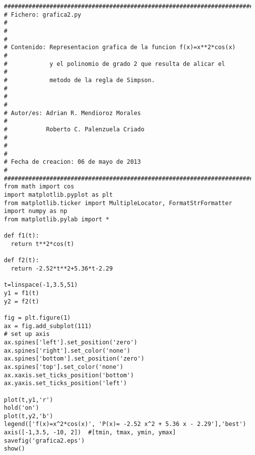 \begin{center}
\begin{footnotesize}
\begin{verbatim}
########################################################################
# Fichero: grafica2.py                                                 #
#                                                                      #
# Contenido: Representacion grafica de la funcion f(x)=x**2*cos(x)     #
#            y el polinomio de grado 2 que resulta de alicar el        #
#            metodo de la regla de Simpson.                            #
#                                                                      #
# Autor/es: Adrian R. Mendioroz Morales                                #
#           Roberto C. Palenzuela Criado                               #
#                                                                      #
# Fecha de creacion: 06 de mayo de 2013                                #
########################################################################
from math import cos
import matplotlib.pyplot as plt
from matplotlib.ticker import MultipleLocator, FormatStrFormatter
import numpy as np
from matplotlib.pylab import *

def f1(t):
  return t**2*cos(t)

def f2(t):
  return -2.52*t**2+5.36*t-2.29

t=linspace(-1,3.5,51)
y1 = f1(t)
y2 = f2(t)
  
fig = plt.figure(1)
ax = fig.add_subplot(111) 
# set up axis
ax.spines['left'].set_position('zero')
ax.spines['right'].set_color('none')
ax.spines['bottom'].set_position('zero')
ax.spines['top'].set_color('none')
ax.xaxis.set_ticks_position('bottom')
ax.yaxis.set_ticks_position('left')
 
plot(t,y1,'r')
hold('on')
plot(t,y2,'b')
legend(['f(x)=x^2*cos(x)', 'P(x)= -2.52 x^2 + 5.36 x - 2.29'],'best')
axis([-1,3.5, -10, 2])  #[tmin, tmax, ymin, ymax]
savefig('grafica2.eps')
show()
\end{verbatim}
\end{footnotesize}
\end{center}
